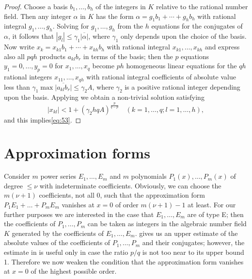 \begin{proof}
Choose a basis $b_1, \ldots, b_h$ of the integers in $K$ relative to the rational number field. Then any integer $\alpha$ in $K$ has the form $\alpha = g_1 b_1 + \cdots + g_h b_h$ with rational integral $g_1, \ldots, g_h$. Solving for $g_1, \dots, g_h$ from the $h$ equations for the conjugates of $\alpha$, it follows that $|g_l| \le \gamma_1 \overline{|\alpha|}$, where $\gamma_1$ only depends upon the choice of the basis. Now write $x_k = x_{k1} b_1 + \cdots + x_{kh} b_h$ with rational integral $x_{k1}, \ldots, x_{kh}$ and express also all $pqh$ products $a_{kl} b_r$ in terms of the basis; then the $p$ equations $y_1 = 0, \dots, y_p = 0$ for $x_1, \ldots, x_q$ become $ph$ homogeneous linear equations for the $qh$ rational integers $x_{11}, \dots, x_{qh}$ with rational integral coefficients of absolute value less than $\gamma_1 \max \overline{|a_{kl} b_r|} \le \gamma_2 A$, where $\gamma_2$ is a positive rational integer depending upon the basis. Applying we obtain a non-trivial solution satisfying
\[|x_{kl}| < 1 + (\gamma_2 hqA)^{\frac{p}{q-p}} \quad (k=1,\ldots,q; l=1,\ldots,h),\]
and this implies\eqref{eq:53}.
\end{proof}

\section{Approximation forms}

Consider $m$ power series $E_1, \dots, E_m$ and $m$ polynomials $P_1(x), \dots, P_m(x)$ of degree $\le \nu$ with indeterminate coefficients. Obviously, we can choose the $m(\nu+1)$ coefficients, not all 0, such that the approximation form $P_1 E_1 + \dots + P_m E_m$ vanishes at $x=0$ of order $m(\nu+1)-1$ at least. For our further purposes we are interested in the case that $E_1, \dots, E_m$ are of type E; then the coefficients of $P_1, \dots, P_m$ can be taken as integers in the algebraic number field $K$ generated by the coefficients of $E_1, \dots, E_m$.  gives us an upper estimate of the absolute values of the coefficients of $P_1, \dots, P_m$ and their conjugates; however, the estimate in is useful only in case the ratio $p/q$ is not too near to its upper bound 1. Therefore we now weaken the condition that the approximation form vanishes at $x=0$ of the highest possible order.


